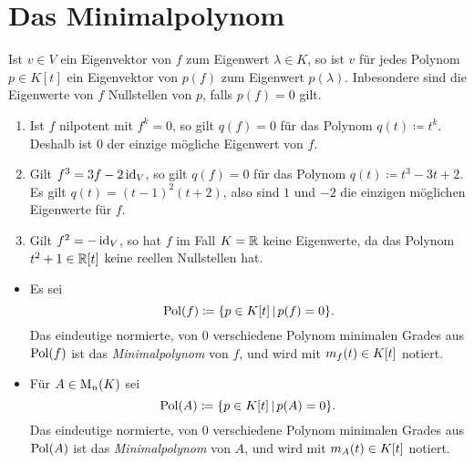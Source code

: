 \section{Das Minimalpolynom}

\begin{lemma}
  \label{lemma: polynomial equations give restriction for the eigenvalues}
  Ist $v \in V$ ein Eigenvektor von $f$ zum Eigenwert $\lambda \in K$, so ist $v$ für jedes Polynom $p \in K[t]$ ein Eigenvektor von $p(f)$ zum Eigenwert $p(\lambda)$.
  Inbesondere sind die Eigenwerte von $f$ Nullstellen von $p$, falls $p(f) = 0$ gilt.
\end{lemma}

\begin{example}
  \leavevmode
  \begin{enumerate}
    \item
      Ist $f$ nilpotent mit $f^k = 0$, so gilt $q(f) = 0$ für das Polynom $q(t) \coloneqq t^k$.
      Deshalb ist $0$ der einzige mögliche Eigenwert von $f$.
    \item
      Gilt $f^3 = 3f - 2 \operatorname{id}_V$, so gilt $q(f) = 0$ für das Polynom $q(t) \coloneqq t^3 - 3t + 2$.
      Es gilt $q(t) = (t-1)^2 (t+2)$, also sind $1$ und $-2$ die einzigen möglichen Eigenwerte für $f$.
    \item
      Gilt $f^2 = -\operatorname{id}_V$, so hat $f$ im Fall $K = \mathbb{R}$ keine Eigenwerte, da das Polynom $t^2 + 1 \in \mathbb{R}[t]$ keine reellen Nullstellen hat.
  \end{enumerate}
\end{example}

\begin{definition}
  \leavevmode
  \begin{itemize}
    \item
      Es sei
      \[
                  \operatorname{Pol}(f)
        \coloneqq \{ p \in K[t] \,|\, p(f) = 0 \}.
      \]
      Das eindeutige normierte, von $0$ verschiedene Polynom minimalen Grades aus $\operatorname{Pol}(f)$ ist das \emph{Minimalpolynom} von $f$, und wird mit $m_{f}(t) \in K[t]$ notiert.
    \item
      Für $A \in \operatorname{M}_{n}(K)$ sei
      \[
                  \operatorname{Pol}(A)
        \coloneqq \{ p \in K[t] \,|\, p(A) = 0 \}.
      \]
      Das eindeutige normierte, von $0$ verschiedene Polynom minimalen Grades aus $\operatorname{Pol}(A)$ ist das \emph{Minimalpolynom} von $A$, und wird mit $m_{A}(t) \in K[t]$ notiert.
  \end{itemize}
\end{definition}

